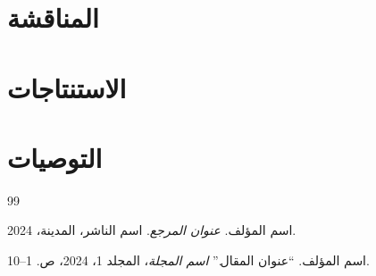 \documentclass[11pt,a4paper]{article}
\begin{document}


\section{المناقشة}


\section{الاستنتاجات}


\section{التوصيات}


\begin{thebibliography}{99}

اسم المؤلف. \textit{عنوان المرجع}. اسم الناشر، المدينة، 2024.

اسم المؤلف. ``عنوان المقال.'' \textit{اسم المجلة}، المجلد 1، 2024، ص. 1--10.

\end{thebibliography}
\end{document}
